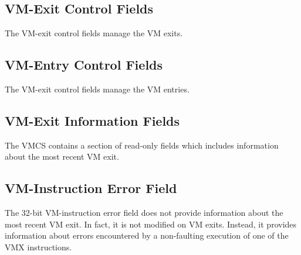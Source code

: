 \documentclass[10pt,draftclsnofoot,peerreview ,letterpaper,onecolumn,]{IEEEtran}
\begin{document}
	\subsection{VM-Exit Control Fields}
	The VM-exit control fields manage the VM exits.
	
	\subsection{VM-Entry Control Fields}
	The VM-exit control fields manage the VM entries.
	
	\subsection{VM-Exit Information Fields}
	The VMCS contains a section of read-only fields which includes information about the most recent VM exit.
	
	\subsection{VM-Instruction Error Field}
	The 32-bit VM-instruction error field does not provide information about the most recent VM exit. In fact, it is not modified on VM exits. Instead, it provides information about errors encountered by a non-faulting execution of one of the VMX instructions.
	
\end{document}
